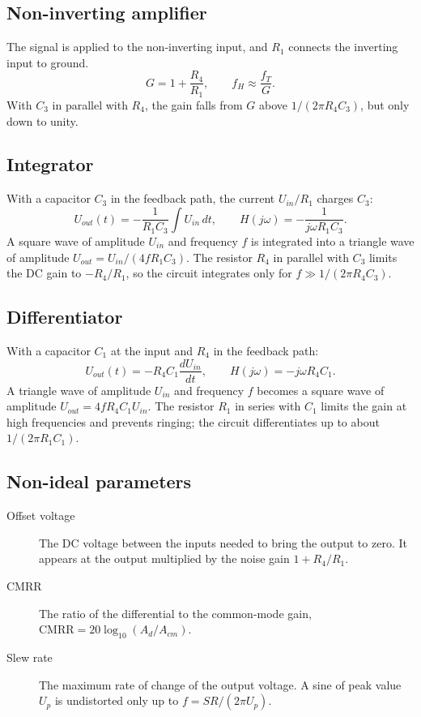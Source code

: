 \subsection{Non-inverting amplifier}\label{sec:th_noninverting}
The signal is applied to the non-inverting input, and $R_1$ connects the inverting input to ground.
\begin{equation}\label{eqn:noninverting}
  G = 1 + \frac{R_4}{R_1}, \qquad f_H \approx \frac{f_T}{G}.
\end{equation}
With $C_3$ in parallel with $R_4$, the gain falls from $G$ above $1/(2\pi R_4 C_3)$, but only down to unity.

\subsection{Integrator}\label{sec:th_integrator}
With a capacitor $C_3$ in the feedback path, the current $U_{in}/R_1$ charges $C_3$:
\begin{equation}\label{eqn:integrator}
  U_{out}(t) = -\frac{1}{R_1 C_3}\int U_{in}\,dt, \qquad H(j\omega) = -\frac{1}{j\omega R_1 C_3}.
\end{equation}
A square wave of amplitude $U_{in}$ and frequency $f$ is integrated into a triangle wave of amplitude $U_{out} = U_{in}/(4 f R_1 C_3)$.
The resistor $R_4$ in parallel with $C_3$ limits the DC gain to $-R_4/R_1$, so the circuit integrates only for $f \gg 1/(2\pi R_4 C_3)$.

\subsection{Differentiator}\label{sec:th_differentiator}
With a capacitor $C_1$ at the input and $R_4$ in the feedback path:
\begin{equation}\label{eqn:differentiator}
  U_{out}(t) = -R_4 C_1 \frac{dU_{in}}{dt}, \qquad H(j\omega) = -j\omega R_4 C_1.
\end{equation}
A triangle wave of amplitude $U_{in}$ and frequency $f$ becomes a square wave of amplitude $U_{out} = 4 f R_4 C_1 U_{in}$.
The resistor $R_1$ in series with $C_1$ limits the gain at high frequencies and prevents ringing; the circuit differentiates up to about $1/(2\pi R_1 C_1)$.

\subsection{Non-ideal parameters}\label{sec:th_nonideal}
\begin{description}
  \item[Offset voltage] The DC voltage between the inputs needed to bring the output to zero. It appears at the output multiplied by the noise gain $1 + R_4/R_1$.
  \item[CMRR] The ratio of the differential to the common-mode gain, $\mathrm{CMRR} = 20\log_{10}(A_d/A_{cm})$.
  \item[Slew rate] The maximum rate of change of the output voltage. A sine of peak value $U_p$ is undistorted only up to $f = SR/(2\pi U_p)$.
\end{description}

